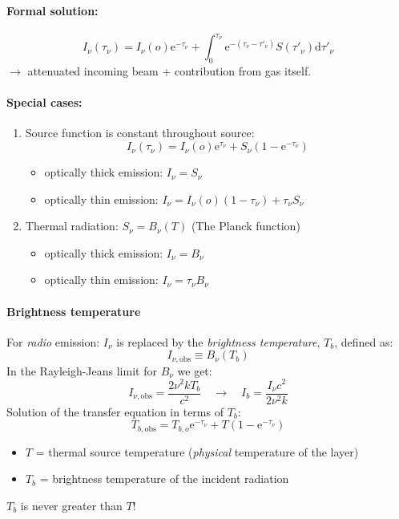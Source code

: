 \documentclass[12pt]{article}
\newcommand{\mar}[1]{\hspace{0pt}\marginpar{-\textcolor{black}{#1}-}}
\begin{document}
\paragraph{Formal solution:}
\[
    I_{\nu}(\tau_{\nu}) = I_{\nu}(o)\mathrm{e}^{-\tau_{\nu}} +
        \int_{0}^{\tau_{\nu}}\!{\mathrm{e}^{-(\tau_{\nu}-\tau'_{\nu})}
        S(\tau'_{\nu})\mathrm{d}\tau'_{\nu}}
        \]
\mar{27}$\rightarrow$ attenuated incoming beam + contribution from gas itself.

\paragraph{Special cases:}
\begin{enumerate}
    \item Source function is constant throughout source:
        \[
            I_{\nu}(\tau_{\nu}) =
            I_{\nu}(o)\mathrm{e}^{\tau_{\nu}}
            + S_{\nu}(1-\mathrm{e}^{-\tau_{\nu}})
            \]
        \begin{itemize}[itemsep=1ex]
            \item optically thick emission:
                $I_{\nu}=S_{\nu}$
            \item optically thin emission:
                $I_{\nu}=I_{\nu}(o)(1-\tau_{\nu}) + \tau_{\nu}S_{\nu}$
        \end{itemize}
    \item Thermal radiation: $S_{\nu} = B_{\nu}(T) $ (The Planck function)
        \begin{itemize}[itemsep=1ex]
            \item optically thick emission:
                $I_{\nu}=B_{\nu}$
            \item optically thin emission:
                $I_{\nu}=\tau_{\nu}B_{\nu}$
        \end{itemize}
\end{enumerate}

\paragraph{Brightness temperature}
For \emph{radio} emission:
$I_{\nu}$ is replaced by the \textit{brightness temperature},
$T_{b}$, defined as:
\[
    I_{\nu,\mathrm{obs}} \equiv B_{\nu}(T_b)
    \]
In the Rayleigh-Jeans limit for $B_{\nu}$ we get:
\[
    I_{\nu,\mathrm{obs}} = \frac{2\nu^{2}kT_{b}}{c^{2}}
    \quad\longrightarrow\quad
    I_{b} = \frac{I_{\nu}c^{2}}{2\nu^{2}k}
    \]
Solution of the transfer equation in terms of $T_{b}$:
\[
    T_{b,\mathrm{obs}} =
    T_{b,o}\mathrm{e}^{-\tau_{\nu}}
    + T(1-\mathrm{e}^{-\tau_{\nu}})
    \]
\begin{itemize}[label={}, noitemsep]
    \item \mar{28}$T$ = thermal source temperature (\emph{physical}
        temperature of the layer)
    \item $T_{b}$ = brightness temperature of the incident radiation
\end{itemize}
\textcolor{bred}{$T_{b}$ is never greater than $T$!}
\end{document}
